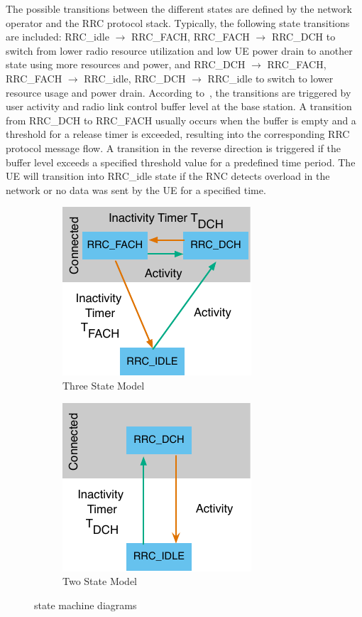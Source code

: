 The possible transitions between the different states are defined by the network operator and the \gls{RRC} protocol stack.
Typically, the following state transitions are included: 
\gls{RRC_idle} \(\rightarrow\) \gls{RRC_FACH},
\gls{RRC_FACH} \(\rightarrow\) \gls{RRC_DCH} to switch from lower radio resource utilization and low \gls{UE} power drain to another state using more resources and power, and 
\gls{RRC_DCH} \(\rightarrow\) \gls{RRC_FACH}, 
\gls{RRC_FACH} \(\rightarrow\) \gls{RRC_idle},
\gls{RRC_DCH} \(\rightarrow\) \gls{RRC_idle} to switch to lower resource usage and power drain.
According to~\cite{Perala2009,Qian2010a}, the transitions are triggered by user activity and radio link control buffer level at the base station. 
A transition from \gls{RRC_DCH} to \gls{RRC_FACH} usually occurs when the buffer is empty and a threshold for a release timer is exceeded, resulting into the corresponding \gls{RRC} protocol message flow.
A transition in the reverse direction is triggered if the buffer level exceeds a specified threshold value for a predefined time period.
The \gls{UE} will transition into \gls{RRC_idle} state if the \gls{RNC} detects overload in the network or no data was sent by the \gls{UE} for a specified time.

\begin{figure}
	\begin{subfigure}[b]{.5\textwidth}
	\centering
	\includegraphics{network/background/figures/three_states}
	\caption{Three State Model}\label{fig:network:background:rrc_state_machines:three_states}
	\end{subfigure}
	\begin{subfigure}[b]{.5\textwidth}
	\centering
	\includegraphics{network/background/figures/two_states}
	\caption{Two State Model}\label{fig:network:background:rrc_state_machines:two_states}
	\end{subfigure}
	\caption{ state machine diagrams}\label{fig:network:background:rrc_state_machines}
\end{figure}

